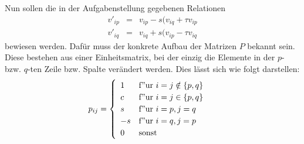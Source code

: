 Nun sollen die in der Aufgabenstellung gegebenen Relationen
\begin{eqnarray}
v'_{ip} &=& v_{ip} - s(v_{iq} + τv_{ip}\\
v'_{iq} &=& v_{iq} + s(v_{ip} - τv_{iq}
\end{eqnarray}
bewiesen werden. Dafür muss der konkrete Aufbau der Matrizen $P$ bekannt sein.
Diese bestehen aus einer Einheitsmatrix, bei der einzig die Elemente in der
$p$- bzw. $q$-ten Zeile bzw. Spalte verändert werden. Dies lässt sich wie folgt
darstellen:
\begin{equation}
p_{ij} = \begin{cases}\begin{array}[h]{ll}
1 & \mathrm{f"ur~} i=j \notin \{p,q\} \\c & \mathrm{f"ur~} i=j \in \{p,q\}\\s &
\mathrm{f"ur~} i=p, j=q\\-s & \mathrm{f"ur~} i=q, j=p\\0 & \mathrm{sonst}
\end{array}\end{cases}
\end{equation}
